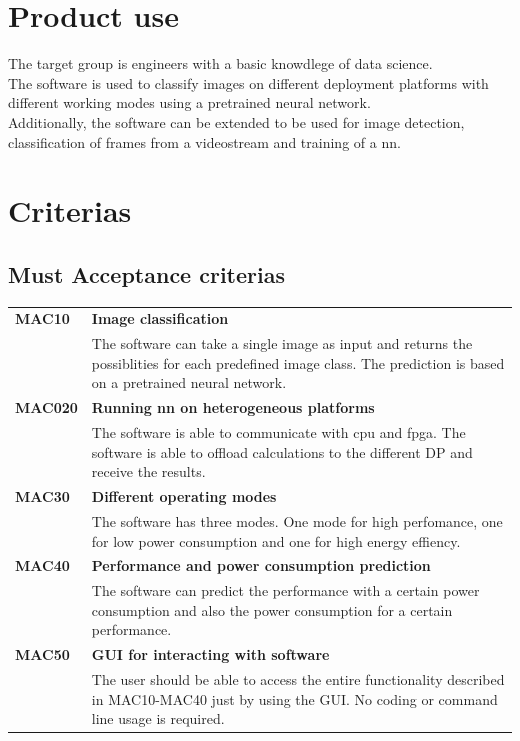 \documentclass[parskip=full]{scrartcl}
\begin{document}
\section{Product use}
The target group is engineers with a basic knowdlege of data science.\\
The software is used to classify images on different deployment platforms with different working modes using a pretrained neural network.\\
Additionally, the software can be extended to be used for image detection, classification of frames from a videostream and training of a \gls{nn}.\\


\section{Criterias}
\subsection{Must Acceptance criterias}
\begin{tabular}{p{2cm}p{12cm}}
\textbf{MAC10} & \textbf{Image classification} \\
& The software can take a single image as input and returns the possiblities for each predefined image class. The prediction is based on a pretrained neural network.\\
\textbf{MAC020} & \textbf{Running \gls{nn} on heterogeneous platforms} \\
& The software is able to communicate with \gls{cpu} and \gls{fpga}. The software is able to offload calculations to the different DP and receive the results.\\
\textbf{MAC30} & \textbf{Different operating modes} \\
& The software has three modes. One mode for high perfomance, one for low power consumption and one for high energy effiency. \\
\textbf{MAC40} & \textbf{Performance and power consumption prediction}\\
& The software can predict the performance with a certain power consumption and also the power consumption for a certain performance.\\
\textbf{MAC50} & \textbf{GUI for interacting with software} \\
& The user should be able to access the entire functionality described in MAC10-MAC40 just by using the GUI. No coding or command line usage is required.
\end{tabular}
\end{document}
